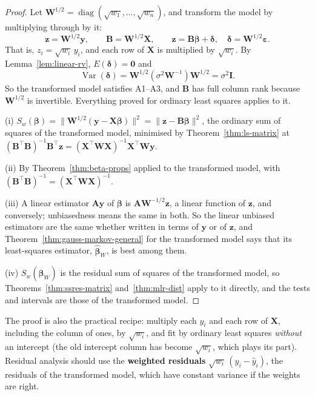 \documentclass[11pt,a4paper]{article}
\numberwithin{equation}{section}
\theoremstyle{definition}
\begin{document}
\begin{proof}
Let $\mathbf{W}^{1/2} = \operatorname{diag}(\sqrt{w_1}, \dots, \sqrt{w_n})$, and transform the model by
multiplying through by it:
\[
\mathbf{z} = \mathbf{W}^{1/2}\mathbf{y}, \qquad \mathbf{B} = \mathbf{W}^{1/2}\mathbf{X}, \qquad
\mathbf{z} = \mathbf{B}\boldsymbol\beta + \boldsymbol\delta, \quad \boldsymbol\delta = \mathbf{W}^{1/2}\boldsymbol\varepsilon .
\]
That is, $z_i = \sqrt{w_i}\,y_i$, and each row of $\mathbf{X}$ is multiplied by $\sqrt{w_i}$. By
Lemma~\ref{lem:linear-rv}, $E(\boldsymbol\delta) = \mathbf{0}$ and
\[
\operatorname{Var}(\boldsymbol\delta) = \mathbf{W}^{1/2}(\sigma^2\mathbf{W}^{-1})\mathbf{W}^{1/2} = \sigma^2\mathbf{I} .
\]
So the transformed model satisfies A1--A3, and $\mathbf{B}$ has full column rank because
$\mathbf{W}^{1/2}$ is invertible. Everything proved for ordinary least squares applies to it.

(i) $S_w(\boldsymbol\beta) = \|\mathbf{W}^{1/2}(\mathbf{y} - \mathbf{X}\boldsymbol\beta)\|^2 = \|\mathbf{z} - \mathbf{B}\boldsymbol\beta\|^2$, the
ordinary sum of squares of the transformed model, minimised by Theorem~\ref{thm:ls-matrix} at
$(\mathbf{B}^\top\mathbf{B})^{-1}\mathbf{B}^\top\mathbf{z} = (\mathbf{X}^\top\mathbf{W}\mathbf{X})^{-1}\mathbf{X}^\top\mathbf{W}\mathbf{y}$.

(ii) By Theorem~\ref{thm:beta-props} applied to the transformed model, with
$(\mathbf{B}^\top\mathbf{B})^{-1} = (\mathbf{X}^\top\mathbf{W}\mathbf{X})^{-1}$.

(iii) A linear estimator $\mathbf{Ay}$ of $\boldsymbol\beta$ is $\mathbf{AW}^{-1/2}\mathbf{z}$, a linear function of
$\mathbf{z}$, and conversely; unbiasedness means the same in both. So the linear unbiased
estimators are the same whether written in terms of $\mathbf{y}$ or of $\mathbf{z}$, and
Theorem~\ref{thm:gauss-markov-general} for the transformed model says that its least-squares
estimator, $\hat{\boldsymbol\beta}_W$, is best among them.

(iv) $S_w(\hat{\boldsymbol\beta}_W)$ is the residual sum of squares of the transformed model, so
Theorems~\ref{thm:ssres-matrix} and~\ref{thm:mlr-dist} apply to it directly, and the tests and
intervals are those of the transformed model.
\end{proof}

The proof is also the practical recipe: multiply each $y_i$ and each row of $\mathbf{X}$,
including the column of ones, by $\sqrt{w_i}$, and fit by ordinary least squares
\emph{without} an intercept (the old intercept column has become $\sqrt{w_i}$, which plays its
part). Residual analysis should use the \textbf{weighted residuals}
$\sqrt{w_i}\,(y_i - \hat y_i)$, the residuals of the transformed model, which have constant
variance if the weights are right.
\end{document}
